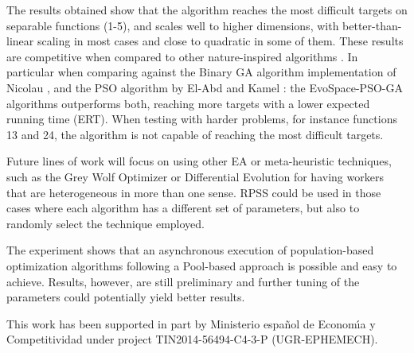 \documentclass[sigconf]{acmart}
\begin{document}
The results obtained show that the algorithm reaches the most difficult 
targets on separable functions (1-5), and scales well to
higher dimensions, with better-than-linear scaling in most cases and
close to quadratic in some of them. These results are competitive 
when compared to other nature-inspired algorithms \cite{hansen2010bbob}.
In particular when comparing against the Binary GA algorithm implementation 
of Nicolau \cite{nicolau2009application}, and the PSO algorithm by 
El-Abd and Kamel \cite{el2009black}: the EvoSpace-PSO-GA 
algorithms outperforms both, reaching more targets with a lower expected 
running time (ERT). When testing with harder problems, for instance functions 
13 and 24, the algorithm is not capable of reaching the most difficult targets. 

Future lines of work will focus on using other EA or 
meta-heuristic techniques, such as the Grey Wolf Optimizer \cite{mirjalili2014grey}
or Differential Evolution \cite{storn1997differential} for having workers that are 
heterogeneous in more than one sense. RPSS could be used 
in those cases where each algorithm has a different set of 
parameters, but also to randomly select the technique employed.

The experiment shows that an asynchronous execution of population-based optimization algorithms 
following a Pool-based approach is possible and easy to achieve.
Results, however, are still preliminary and further tuning of the parameters could 
potentially yield better results. 

\begin{acks}
This work has been supported in part by  Ministerio espa\~{n}ol de
Econom\'{\i}a y Competitividad under project TIN2014-56494-C4-3-P
(UGR-EPHEMECH).
\end{acks}



 

\clearpage %
\end{document}
